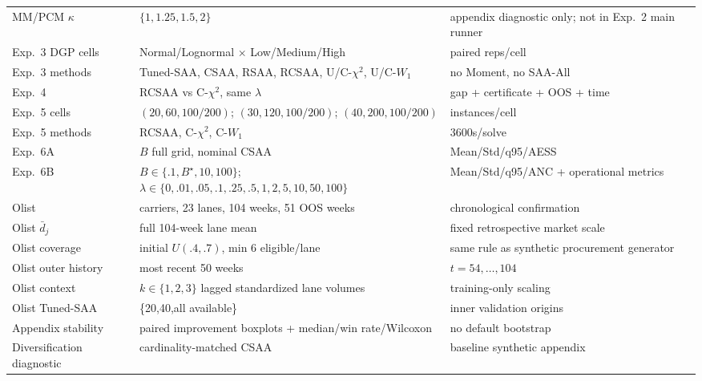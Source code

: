 \documentclass[11pt,a4paper]{ctexart}
\begin{document}
\begin{center}
\begin{longtable}{>{\raggedright\arraybackslash}p{3.6cm} >{\raggedright\arraybackslash}p{7.1cm} >{\raggedright\arraybackslash}p{4.0cm}}
MM/PCM $\kappa$ & $\{1,1.25,1.5,2\}$ & appendix diagnostic only; not in Exp.~2 main runner\\
Exp.~3 DGP cells & Normal/Lognormal $\times$ Low/Medium/High & 10 paired reps/cell\\
Exp.~3 methods & Tuned-SAA, CSAA, RSAA, RCSAA, U/C-$\chi^2$, U/C-$W_1$ & no Moment, no SAA-All\\
Exp.~4 & RCSAA vs C-$\chi^2$, same $\lambda$ & gap + certificate + OOS + time\\
Exp.~5 cells & $(20,60,100/200)$; $(30,120,100/200)$; $(40,200,100/200)$ & 3 instances/cell\\
Exp.~5 methods & RCSAA, C-$\chi^2$, C-$W_1$ & 3600s/solve\\
Exp.~6A & $B$ full grid, nominal CSAA & Mean/Std/q95/AESS\\
Exp.~6B & $B\in\{.1,B^\star,10,100\}$; $\lambda\in\{0,.01,.05,.1,.25,.5,1,2,5,10,50,100\}$ & Mean/Std/q95/ANC + operational metrics\\
Olist & 20 carriers, 23 lanes, 104 weeks, 51 OOS weeks & chronological confirmation\\
Olist $\bar d_j$ & full 104-week lane mean & fixed retrospective market scale\\
Olist coverage & initial $U(.4,.7)$, min 6 eligible/lane & same rule as synthetic procurement generator\\
Olist outer history & most recent 50 weeks & $t=54,\ldots,104$\\
Olist context & $k\in\{1,2,3\}$ lagged standardized lane volumes & training-only scaling\\
Olist Tuned-SAA & \{20,40,all available\} & 10 inner validation origins\\
Appendix stability & paired improvement boxplots + median/win rate/Wilcoxon & no default bootstrap\\
Diversification diagnostic & cardinality-matched CSAA & baseline synthetic appendix\\
\bottomrule
\end{longtable}
\end{center}
\end{document}
